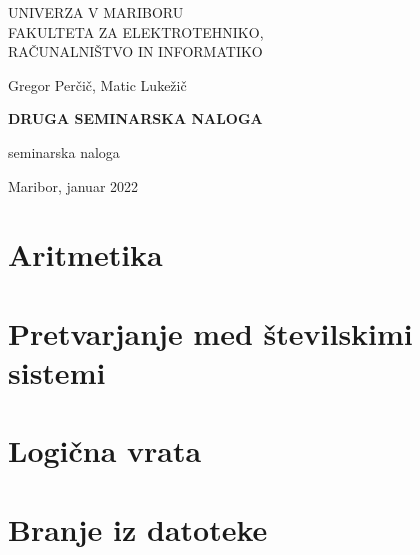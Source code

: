\documentclass[12pt]{article}
\begin{document}
	
	\begin{center}
		\large
		\thispagestyle{empty}
		UNIVERZA V MARIBORU \\
		FAKULTETA ZA ELEKTROTEHNIKO, \\
		RAČUNALNIŠTVO IN INFORMATIKO
		
		\vspace{7cm}
		
		Gregor Perčič, Matic Lukežič
		
		\vspace{1cm}
		
		\textbf{\LARGE DRUGA SEMINARSKA NALOGA}
		
		\vspace{1cm}
		
		seminarska naloga
		
		\vspace{9cm}
		
		Maribor, januar 2022
		
	\end{center}
	
	\cleardoublepage
	
	{\hypersetup{hidelinks}\tableofcontents}
	
	\section{Aritmetika}
	
	\section{Pretvarjanje med številskimi sistemi}
	
	\section{Logična vrata}
	
	\section{Branje iz datoteke}
	
	
	
\end{document}
